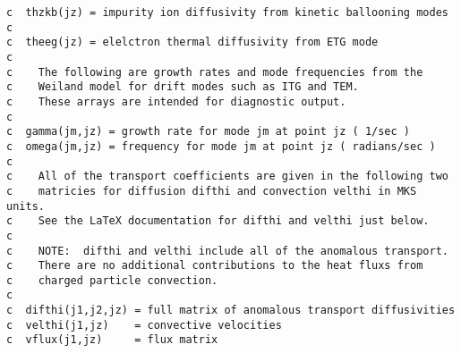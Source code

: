 \begin{verbatim}
c  thzkb(jz) = impurity ion diffusivity from kinetic ballooning modes
c
c  theeg(jz) = elelctron thermal diffusivity from ETG mode
c
c    The following are growth rates and mode frequencies from the
c    Weiland model for drift modes such as ITG and TEM.
c    These arrays are intended for diagnostic output.
c
c  gamma(jm,jz) = growth rate for mode jm at point jz ( 1/sec )
c  omega(jm,jz) = frequency for mode jm at point jz ( radians/sec )
c
c    All of the transport coefficients are given in the following two
c    matricies for diffusion difthi and convection velthi in MKS units.
c    See the LaTeX documentation for difthi and velthi just below.
c
c    NOTE:  difthi and velthi include all of the anomalous transport.
c    There are no additional contributions to the heat fluxs from
c    charged particle convection.
c
c  difthi(j1,j2,jz) = full matrix of anomalous transport diffusivities
c  velthi(j1,jz)    = convective velocities
c  vflux(j1,jz)     = flux matrix
\end{verbatim}

